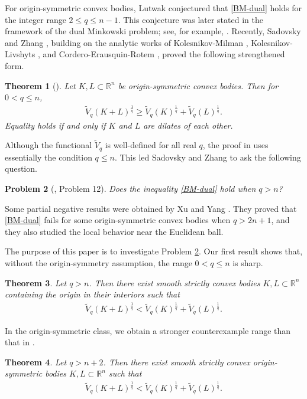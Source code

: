 \documentclass[12pt,leqno]{amsart}
\theoremstyle{plain} \newtheorem{thm}{Theorem}[section]
\theoremstyle{plain} \newtheorem{prop}[thm]{Proposition}
\theoremstyle{plain} \newtheorem{prob}[thm]{Problem}
\theoremstyle{definition} \newtheorem{defi}[thm]{Definition}
\theoremstyle{plain} \newtheorem{cor}[thm]{Corollary}
\theoremstyle{plain} \newtheorem{lem}[thm]{Lemma}
\theoremstyle{plain} \newtheorem{eg}{Example}[section]
\theoremstyle{remark} \newtheorem{rmk}[thm]{Remark}
\theoremstyle{plain} \newtheorem{conj}{Conjecture}
\numberwithin{equation}{section}
\newcommand{\bR}{\mathbb{R}}
\newcommand{\tV}{\widetilde V}
\begin{document}
For origin-symmetric convex bodies, Lutwak conjectured that \eqref{BM-dual} holds for the integer range $2\leq q\leq n-1$. This conjecture was later stated in the framework of the dual Minkowski problem; see, for example, \cite{HLYZ16,HYZ25}. Recently, Sadovsky and Zhang \cite{SZ25}, building on the analytic works of Kolesnikov-Milman \cite{KM18,KM22}, 
Kolesnikov-Livshyts \cite{KL21}, and Cordero-Erausquin-Rotem \cite{CER23}, 
proved the following strengthened form.

\begin{thm}[\cite{SZ25}]\label{thm-SZ}
Let $K,L\subset \bR^n$ be origin-symmetric convex bodies. Then for $0<q\leq n$,
\begin{align}\label{SZ-BM}
    \tV_q(K+L)^{\frac1q}\geq \tV_q(K)^{\frac1q}+\tV_q(L)^{\frac1q}.
\end{align}
Equality holds if and only if $K$ and $L$ are dilates of each other.
\end{thm}


Although the functional $\tV_q$ is well-defined for all real $q$, the proof in \cite{SZ25} uses essentially the condition $q\leq n$. This led Sadovsky and Zhang to ask the following question.

\begin{prob}[\cite{SZ25}, Problem 12]\label{problem-SZ}
Does the inequality \eqref{BM-dual} hold when $q>n$?
\end{prob}

Some partial negative results were obtained by Xu and Yang \cite{XY26}. They proved that \eqref{BM-dual} fails for some origin-symmetric convex bodies when $q>2n+1$, and they also studied the local behavior near the Euclidean ball.

The purpose of this paper is to investigate Problem \ref{problem-SZ}. Our first result shows that, without the origin-symmetry assumption, the range $0<q\leq n$ is sharp.

\begin{thm}\label{thm-nonsym-fail}
Let $q>n$. Then there exist smooth strictly convex bodies $K,L\subset \bR^n$ containing the origin in their interiors such that
\begin{align}
    \tV_q(K+L)^{\frac1q}<\tV_q(K)^{\frac1q}+\tV_q(L)^{\frac1q}.
\end{align}
\end{thm}

In the origin-symmetric class, we obtain a stronger counterexample range than that in \cite{XY26}.

\begin{thm}\label{thm-sym-fail}
Let $q>n+2$. Then there exist smooth strictly convex origin-symmetric bodies $K,L\subset \bR^n$ such that
\begin{align}
    \tV_q(K+L)^{\frac1q}<\tV_q(K)^{\frac1q}+\tV_q(L)^{\frac1q}.
\end{align}
\end{thm}
\end{document}
